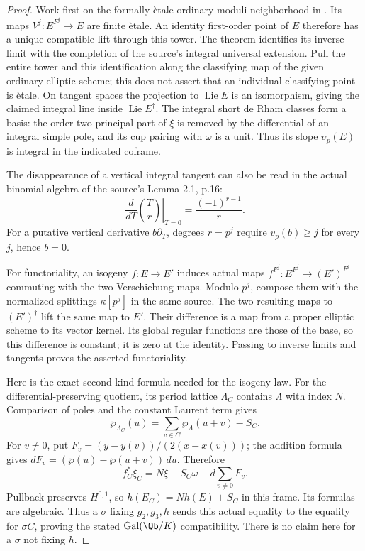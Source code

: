 \begin{proof}
Work first on the formally \`etale ordinary moduli neighborhood in
\cite[\S2.2, pp.16--19; Theorem 2.2]{EllMochizuki2000Connections}.
Its maps $V^j:E^{F^j}\to E$ are finite \`etale. An identity
first-order point of $E$ therefore has a unique compatible lift
through this tower. The theorem identifies its inverse limit with
the completion of the source's integral universal extension.
Pull the entire tower and this identification along the classifying
map of the given ordinary elliptic scheme; this does not assert that
an individual classifying point is \`etale. On tangent spaces the
projection to $\operatorname{Lie}E$ is an isomorphism, giving the
claimed integral line inside $\operatorname{Lie}E^\dagger$.
The integral short de Rham classes form a basis: the order-two
principal part of $\xi$ is removed by the differential of an
integral simple pole, and its cup pairing with $\omega$ is a unit.
Thus its slope $\upsilon_p(E)$ is integral in the indicated coframe.

The disappearance of a vertical integral tangent can also be read
in the actual binomial algebra of the source's Lemma 2.1, p.16:
\[
 \left.\frac{d}{dT}\binom{T}{r}\right|_{T=0}
       =\frac{(-1)^{r-1}}r.
\]
For a putative vertical derivative $b\partial_T$, degrees $r=p^j$
require $v_p(b)\ge j$ for every $j$, hence $b=0$.

For functoriality, an isogeny $f:E\to E'$ induces actual maps
$f^{F^j}:E^{F^j}\to(E')^{F^j}$ commuting with the two Verschiebung
maps. Modulo $p^j$, compose them with the normalized splittings
$\kappa[p^j]$ in the same source. The two resulting maps to
$(E')^\dagger$ lift the same map to $E'$. Their difference is a map
from a proper elliptic scheme to its vector kernel. Its global
regular functions are those of the base, so this difference is
constant; it is zero at the identity. Passing to inverse limits and
tangents proves the asserted functoriality.

Here is the exact second-kind formula needed for the isogeny law.
For the differential-preserving quotient, its period lattice
$\Lambda_C$ contains $\Lambda$ with index $N$. Comparison of poles
and the constant Laurent term gives
\[
 \wp_{\Lambda_C}(u)=\sum_{v\in C}\wp_\Lambda(u+v)-S_C.
\]
For $v\ne0$, put
$F_v=(y-y(v))/(2(x-x(v)))$; the addition formula gives
$dF_v=(\wp(u)-\wp(u+v))\,du$. Therefore
\[
 f_C^*\xi_C=N\xi-S_C\omega-d\sum_{v\ne0}F_v.
\]
Pullback preserves $H^{0,1}$, so $h(E_C)=Nh(E)+S_C$ in this frame.
Its formulas are algebraic. Thus a $\sigma$ fixing $g_2,g_3,h$
sends this actual equality to the equality for $\sigma C$, proving
the stated $\operatorname{Gal}(\Qb/K)$ compatibility. There is no
claim here for a $\sigma$ not fixing $h$.


\end{proof}
